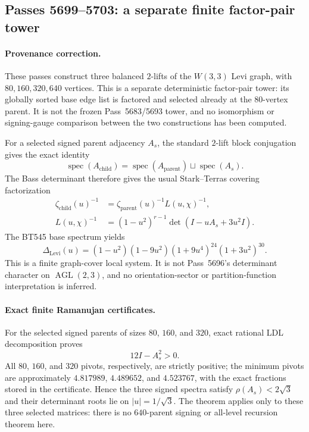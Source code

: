 \subsection*{Passes 5699--5703: a separate finite factor-pair tower}

\paragraph{Provenance correction.}
These passes construct three balanced $2$-lifts of the $W(3,3)$ Levi graph,
with $80,160,320,640$ vertices.  This is a separate deterministic factor-pair
tower: its globally sorted base edge list is factored and selected already at
the $80$-vertex parent.  It is not the frozen Pass~5683/5693 tower, and no
isomorphism or signing-gauge comparison between the two constructions has been
computed.

For a selected signed parent adjacency $A_s$, the standard $2$-lift block
conjugation gives the exact identity
\[
 \operatorname{spec}(A_{\mathrm{child}})
 =
 \operatorname{spec}(A_{\mathrm{parent}})
 \sqcup
 \operatorname{spec}(A_s).
\]
The Bass determinant therefore gives the usual Stark--Terras covering
factorization
\[
 \begin{aligned}
 \zeta_{\mathrm{child}}(u)^{-1}
 &=\zeta_{\mathrm{parent}}(u)^{-1}L(u,\chi)^{-1},\\
 L(u,\chi)^{-1}
 &=(1-u^2)^{r-1}\det(I-uA_s+3u^2I).
 \end{aligned}
\]
The BT545 base spectrum yields
\[
 \Delta_{\mathrm{Levi}}(u)
 =
 (1-u^2)(1-9u^2)(1+9u^4)^{24}(1+3u^2)^{30}.
\]
This is a finite graph-cover local system.  It is not Pass~5696's determinant
character on $\operatorname{AGL}(2,3)$, and no orientation-sector or
partition-function interpretation is inferred.

\paragraph{Exact finite Ramanujan certificates.}
For the selected signed parents of sizes $80$, $160$, and $320$, exact rational
LDL decomposition proves
\[
 12I-A_s^2>0.
\]
All $80$, $160$, and $320$ pivots, respectively, are strictly positive; the
minimum pivots are approximately $4.817989$, $4.489652$, and $4.523767$, with
the exact fractions stored in the certificate.  Hence the three signed spectra
satisfy $\rho(A_s)<2\sqrt3$ and their determinant roots lie on
$|u|=1/\sqrt3$.  The theorem applies only to these three selected matrices:
there is no $640$-parent signing or all-level recursion theorem here.

